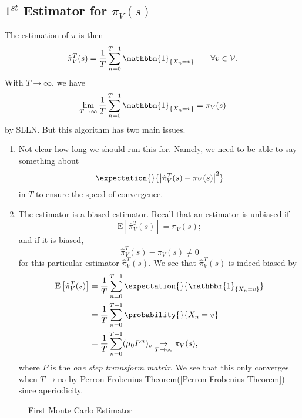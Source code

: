 \subsection{\(1^{st}\) Estimator for \(\pi_V(s)\)}
The estimation of \(\pi\) is then
\[
	\hat{\pi}^{T}_{V}(s) = \frac{1}{T}\sum\limits_{n=0}^{T-1} \mathbbm{1}_{\{X_n = v\}}\qquad \forall v\in \mathcal{V}.
\]
With \(T\to \infty \), we have
\[
	\lim_{T\to \infty}\frac{1}{T} \sum\limits_{n=0}^{T-1} \mathbbm{1}_{\{X_n = v\}} = \pi_V(s)
\]
by SLLN. But this algorithm has two main issues.
\begin{enumerate}
	\item Not clear how long we should run this for. Namely, we need to be able to say something about
	      \[
		      \expectation{}{\left\vert \hat{\pi}^{T}_V(s) - \pi_V(s) \right\vert^2 }
	      \]
	      in \(T\) to ensure the speed of convergence.
	\item The estimator is a biased estimator. Recall that an estimator is unbiased if
	      \[
		      \mathrm{E}\left[ \hat{\pi}_{V}^{T}(s) \right] = \pi_V(s);
	      \]
	      and if it is biased,
	      \[
		      \hat{\pi}_{V}^{T}(s) - \pi_V(s)\neq 0
	      \]
	      for this particular estimator \(\hat{\pi}^{T}_V(s)\). We see that \(\hat{\pi}^{T}_V(s)\) is indeed biased by
	      \[
		      \begin{split}
			      \mathrm{E}\left[\hat{\pi}^{T}_V(s)\right] &= \frac{1}{T}\sum\limits_{n=0}^{T-1} \expectation{}{\mathbbm{1}_{\{X_n = v\}}}\\
			      &= \frac{1}{T}\sum\limits_{n=0}^{T-1} \probability{}{X_n = v} \\
			      &= \frac{1}{T}\sum\limits_{n=0}^{T-1} (\mu_0 P^n)_v\underset{T\to \infty }{\to }\pi_V(s),
		      \end{split}
	      \]
	      where \(P\) is the \emph{one step trransform matrix}. We see that this only converges when \(T\to \infty \) by Perron-Frobenius Theorem(\autoref{Perron-Frobenius Theorem})
	      since aperiodicity.
\end{enumerate}

\begin{figure}[H]
	\centering
	\caption{First Monte Carlo Estimator}
	\label{fig:Monte-Carlo-Estimator-1}
\end{figure}

